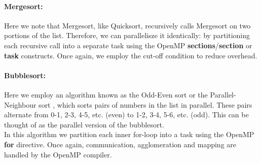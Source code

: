 \documentclass[10pt]{article}
\begin{document}
\paragraph{Mergesort:}
Here we note that Mergesort, like Quicksort, recursively calls Mergesort on two portions of the list. Therefore, we can parallelisze it identically: by partitioning each recursive call into a separate task using the OpenMP \textbf{sections}/\textbf{section} or \textbf{task} constructs. Once again, we employ the cut-off condition to reduce overhead.
\paragraph{Bubblesort:}
Here we employ an algorithm known as the Odd-Even sort or the Parallel-Neighbour sort \cite{habermann72}, which sorts pairs of numbers in the list in parallel. These pairs alternate from 0-1, 2-3, 4-5, etc. (even) to 1-2, 3-4, 5-6, etc. (odd). This can be thought of as the parallel version of the bubblesort.
\\
In this algorithm we partition each inner for-loop into a task using the OpenMP \textbf{for} directive. Once again, communication, agglomeration and mapping are handled by the OpenMP compiler.
\end{document}
